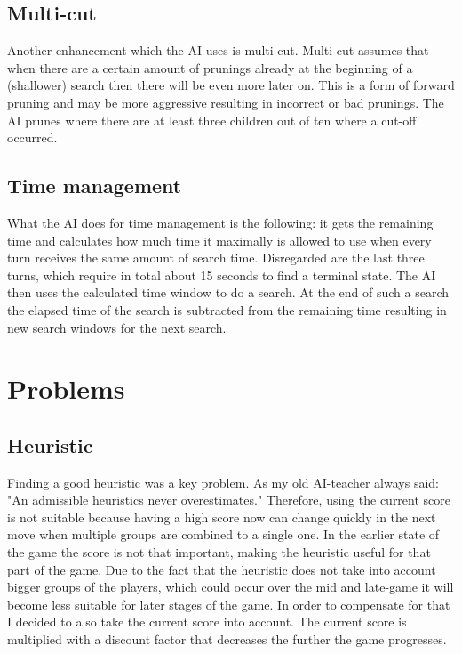 \documentclass[a4paper]{article}
\begin{document}
\subsection{Multi-cut}
Another enhancement which the AI uses is multi-cut. Multi-cut assumes that when there are a certain amount of prunings already at the beginning of a (shallower) search then there will be even more later on. This is a form of forward pruning and may be more aggressive resulting in incorrect or bad prunings. The AI prunes where there are at least three children out of ten where a cut-off occurred.

\subsection{Time management}
What the AI does for time management is the following: it gets the remaining time and calculates how much time it maximally is allowed to use when every turn receives the same amount of search time. Disregarded are the last three turns, which require in total about 15 seconds to find a terminal state. The AI then uses the calculated time window to do a search. At the end of such a search the elapsed time of the search is subtracted from the remaining time resulting in new  search windows for the next search.

\section{Problems}
\subsection{Heuristic}
Finding a good heuristic was a key problem. As my old AI-teacher always said: "An admissible heuristics never overestimates." Therefore, using the current score is not suitable because having a high score now can change quickly in the next move when multiple groups are combined to a single one. In the earlier state of the game the score is not that important, making the heuristic useful for that part of the game. Due to the fact that the heuristic does not take into account bigger groups of the players, which could occur over the mid and late-game it will become less suitable for later stages of the game. In order to compensate for that I decided to also take the current score into account. The current score is multiplied with a discount factor that decreases the further the game progresses.
\end{document}
